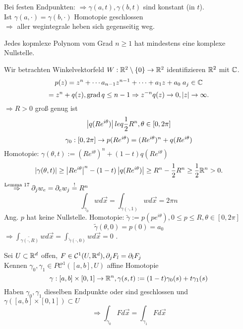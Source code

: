 \documentclass[../ana2.tex]{subfiles}
\begin{document}
\begin{bem}
    Bei festen Endpunkten: \(\Rightarrow \gamma(a,t), \gamma(b,t) \) sind konstant (in \(t\)).\\
    Ist \(\gamma(a, \cdot) = \gamma(b, \cdot)\) Homotopie geschlossen\\
    \(\Rightarrow\) aller wegintegrale heben sich gegenseitig weg.
\end{bem}
\begin{satz}
    Jedes kopmlexe Polynom vom Grad \( n \geq 1 \) hat 
    mindestens eine komplexe Nullstelle.
\end{satz}
\begin{bew}
    Wir betrachten Winkelvektorfeld \( W:\mathbb{R}^2 \setminus \{0\}\rightarrow \mathbb{R}^2 \) 
    identifizieren \( \mathbb{R}^2 \) mit \( \mathbb{C} \).
    \[ p(z) = z^n + \cdots a_{n-1} z^{n-1} + \cdots + a_1 z + a_0 \; a_j \in \mathbb{C} \]
    \[ = z^n + q(z), \operatorname{grad} q \leq n - 1 \Rightarrow z^{-n} q(z) \rightarrow 0, \left|z\right| \rightarrow \infty. \]
    \(\Rightarrow R > 0\) groß genug ist 
    \[ \left|q(Re^{i \theta}) \right| leq \frac{1}{2} R^n, \theta \in [0, 2\pi] \]
    \[ \gamma_0:[0,2\pi]\rightarrow {p(Re^{i\theta})} = (Re^{i\theta})^n + q(Re^{i\theta}) \]
    Homotopie: \( \gamma(\theta, t) := (R e^{i\theta})^n + (1-t) q (R e^{i \theta}) \)
    \[ \left| \gamma(\theta, t) \right| \geq \left| R e^{i\theta} \right|^n - (1-t) \left| q (R e^{i\theta}) \right| 
    \geq R^n - \frac{1}{2} R^n \geq \frac{1}{2} \mathbb{R}^n > 0. \]
    \( \overset{\text{Lemma 17}}{\Rightarrow} \partial_j w_e = \partial_e w_j \overset{\text{!}}{=} R^n \)
    \[ \int_{\gamma_0} w d\vec{x} = \int_{\gamma(\cdot, 1)} w d\vec{x} = 2\pi n \]
    Ang. \( p \) hat keine Nullstelle.
    Homotopie: \( \tilde{\gamma} := p(p e^{i\theta}), 0 \leq p \leq R, \theta \in [0,2\pi] \)
    \[ \tilde{\gamma}(\theta, 0) = p(0) = a_0 \]
    \( \Rightarrow \int_{\tilde{\gamma(\cdot, R)}} w d\vec{x} 
    = \int_{\tilde{\gamma}(\cdot, 0) } w d\vec{x} = 0 \) \Lightning.
\end{bew}
\begin{lem}
    Sei \(U \subset \mathbb{R}^d \) offen, \( F \in \mathcal{C}^1(U, \mathbb{R}^d), \partial_j F_l = \partial_l F_j \)\\
    Kennen \( \gamma_0, \gamma_1 \in P\mathcal{C}^1([a,b], U) \) affine Homotopie 
    \[ \gamma:[a,b] \times [0,1]\rightarrow \mathbb{R}^n, \gamma(s,t) := (1-t)\gamma_0(s) + t \gamma_1(s) \]
    Haben \(\gamma_0,\gamma_1\) dieselben Endpunkte oder sind geschlossen und 
    \(\gamma([a,b]\times[0,1]) \subset U \)
    \[ \Rightarrow \int_{\gamma_0} F d\vec{x} = \int_{\gamma_1} F d\vec{x} \]
\end{lem}
\end{document}
